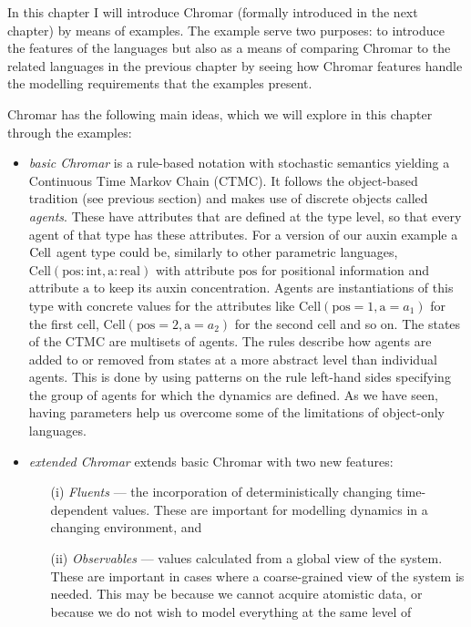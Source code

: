 In this chapter I will introduce Chromar (formally introduced in the next
chapter) by means of examples. The example serve two purposes: to introduce the
features of the languages but also as a means of comparing Chromar to the related
languages in the previous chapter by seeing how Chromar features handle the
modelling requirements that the examples present.

Chromar has the following main ideas, which we will explore in this chapter
through the examples:
\begin{itemize}
\item \emph{basic Chromar} is a rule-based notation with stochastic semantics
  yielding a Continuous Time Markov Chain (CTMC). It follows the object-based
  tradition (see previous section) and makes use of discrete objects called
  \emph{agents}. These have attributes that are defined at the type level, so
  that every agent of that type has these attributes. For a version of our auxin
  example a $\mathrm{Cell}$ agent type could be, similarly to other parametric
  languages,
  $\mathrm{Cell}(\mathrm{pos}:\mathrm{int}, \mathrm{a}: \mathrm{real})$ with
  attribute $\mathrm{pos}$ for positional information and attribute $\mathrm{a}$
  to keep its auxin concentration. Agents are instantiations of this type with
  concrete values for the attributes like
  $\mathrm{Cell}(\mathrm{pos}=1, \mathrm{a}=a_1)$ for the first cell,
  $\mathrm{Cell}(\mathrm{pos}=2, \mathrm{a}=a_2)$ for the second cell and so
  on. The states of the CTMC are multisets of agents. The rules describe how
  agents are added to or removed from states at a more abstract level than
  individual agents. This is done by using patterns on the rule left-hand sides
  specifying the group of agents for which the dynamics are defined. As we have
  seen, having parameters help us overcome some of the limitations of object-only
  languages.
\item \emph{extended Chromar} extends basic Chromar with two new features:
  \begin{itemize}
  \item[(i)] \textit{Fluents} --- the incorporation of deterministically
    changing time-dependent values. These are important for modelling dynamics
    in a changing environment, and
  \item[(ii)] \textit{Observables} --- values calculated from a global view of
    the system. These are important in cases where a coarse-grained view of the
    system is needed. This may be because we cannot acquire atomistic data, or
    because we do not wish to model everything at the same level of

\end{itemize}
\end{itemize}
